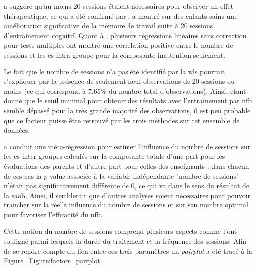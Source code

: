 \citet{Vernon2004} a suggéré qu'au moins 20 sessions étaient nécessaires pour observer un effet thérapeutique, 
ce qui a été confirmé par \citet{Arns2014, Arns2009, Wang2014}. 
\citet{Wang2014} a montré sur des enfants sains une amélioration significative de la mémoire de travail suite à 20 sessions d'entrainement cognitif.
Quant à \citet{Arns2009}, plusieurs régressions linéaires sans correction pour tests multiples ont montré une
corrélation positive entre le nombre de sessions et les \gls{es}-intra-groupe pour la composante inattention seulement. 

Le fait que le nombre de sessions n'a pas été identifié par la \gls{wls}
pourrait s'expliquer par la présence de seulement neuf observations de 20 sessions ou moins (ce qui correspond à 7.65\% du nombre total d'observations). 
Ainsi, étant donné que le seuil minimal pour obtenir des résultats avec l'entrainement par \gls{nfb} semble dépassé pour la très grande majorité des observations, 
il est peu probable que ce facteur puisse être retrouvé par les trois méthodes sur cet ensemble de données. 

\citet{Cortese2016} a conduit une méta-régression pour estimer l'influence du nombre de sessions
sur les \gls{es}-inter-groupes calculés sur la composante totale d'une part pour les évaluations des parents et d'autre part pour celles des enseignants : 
dans chacun de ces cas la $p$-value associée à la variable indépendante "nombre de sessions" n'était pas significativement différente de 0, ce qui va dans le sens 
du résultat de la \gls{saob}. Ainsi, il semblerait que d'autres analyses soient nécessaires pour pouvoir trancher sur la réelle influence du nombre de sessions 
et sur son nombre optimal pour favoriser l'efficacité du \gls{nfb}.

Cette notion du nombre de sessions comprend plusieurs aspects comme l'ont souligné \citet{Strehl2014} parmi lesquels la durée du traitement et la fréquence des 
sessions. Afin de se rendre compte du lien entre ces trois paramètres un \textit{pairplot} a été tracé à la Figure~\ref{Figure:factors_pairplot}.

